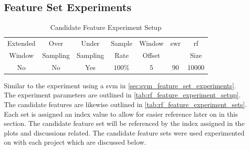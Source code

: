 \subsection{Feature Set Experiments}

\begin{table}[h]
\begin{center}

    \begin{tabular}{|c|c|c|c|c|c|c|}
        \hline
        Extended & Over & Under & Sample & Window & \gls{swr} & \gls{rf} \\
        Window & Sampling & Sampling & Rate & Offset &  & Size \\ \hline
        No & No & Yes & $100\%$ & 5 & 90 & 10000 \\ \hline
    \end{tabular}
    \caption{Candidate Feature Experiment Setup}
    \label{tab:rf_feature_experiment_setup}
\end{center}

\end{table}



Similar to the experiment using a \gls{svm} in \autoref{sec:svm_feature_set_experiments}. The experiment parameters are outlined in \autoref{tab:rf_feature_experiment_setup}. The candidate features are likewise outlined in \autoref{tab:rf_feature_experiment_sets}. Each set is assigned an index value to allow for easier reference later on in this section. The candidate feature set will be referenced by the index assigned in the plots and discussions related. The candidate feature sets were used experimented on with each project which are discussed below.

